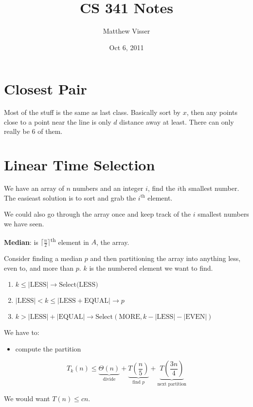 \documentclass[12pt]{article}
\begin{document}
\title{CS 341 Notes}
\author{Matthew Visser}
\date{Oct  6, 2011}
\maketitle

\section{Closest Pair}

Most of the stuff is the same as last class. Basically sort by $x$, then any
points close to a point near the line is only $d$ distance away at least. There
can only really be 6 of them.

\section{Linear Time Selection}

We have an array of $n$ numbers and an integer $i$, find the $i$th smallest
number. The easieast solution is to sort and grab the $i^{\text{th}}$ element.

We could also go through the array once and keep track of the $i$ smallest
numbers we have seen.

\textbf{Median}: is $\lceil \frac{n}{2}\rceil$\textsuperscript{th} element in
$A$, the array.

Consider finding a median $p$ and then partitioning the array into anything
less, even to, and more than $p$. $k$ is the numbered element we want to find.
\begin{enumerate}
	\item $k \leq |\text{LESS}| \to \text{Select(LESS)}$
	\item $|\text{LESS}|<k \leq |\text{LESS} + \text{EQUAL}| \to p$
	\item $k > |\text{LESS}| + |\text{EQUAL}| \to \text{Select}( \text{MORE},
		k-|\text{LESS}| - |\text{EVEN}|)$
\end{enumerate}

We have to:
\begin{itemize}
	\item compute the partition
\end{itemize}

\begin{equation}
	T_k(n) \leq \underbrace{\Theta(n)}_{\text{divide}} +
	\underbrace{T\left(\frac{n}{5}\right)}_{\text{find }p} +
	\underbrace{T\left( \frac{3n}{4} \right)}_{\text{next partition}}
\end{equation}

We would want $T(n) \leq cn$.
\end{document}
